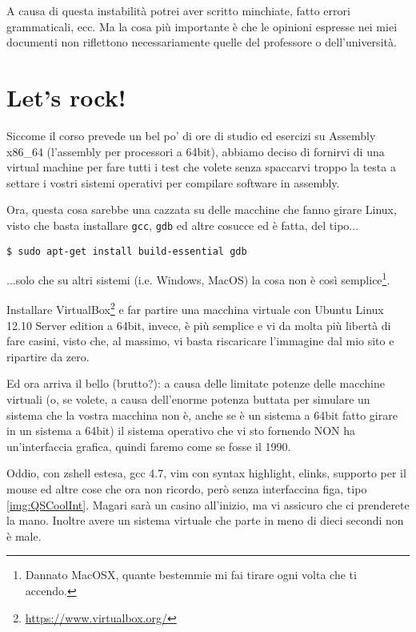 \documentclass[a4paper]{memoir}
\begin{document}
		A causa di questa instabilità potrei aver scritto minchiate, fatto errori
		grammaticali, ecc. Ma la cosa più
		importante è che le opinioni espresse nei miei documenti non riflettono
		necessariamente quelle del professore o dell'università.

\chapter{Let's rock!}

	Siccome il corso prevede un bel po' di ore di studio ed esercizi su Assembly x86\_{}64
	(l'assembly per processori a 64bit), abbiamo deciso di fornirvi di una virtual
	machine per fare tutti i test che volete senza spaccarvi troppo la testa a settare
	i vostri sistemi operativi per compilare software in assembly.
	
	Ora, questa cosa sarebbe una cazzata su delle macchine che fanno girare Linux, visto
	che basta installare \texttt{gcc}, \texttt{gdb} ed altre cosucce ed è fatta, del tipo...
	
	\begin{Verbatim}[label=È tutto più semplice con linux quando si parla di programmazione]
$ sudo apt-get install build-essential gdb
	\end{Verbatim}
	
	...solo che su altri sistemi (i.e. Windows, MacOS) la cosa non è così semplice\footnote{Dannato
	MacOSX, quante bestemmie mi fai tirare ogni volta che ti accendo.}.
	
	Installare VirtualBox\footnote{\url{https://www.virtualbox.org/}} e far partire una macchina
	virtuale con Ubuntu Linux 12.10 Server edition
	a 64bit, invece, è più semplice e vi da molta più libertà di fare casini, visto che, al massimo,
	vi basta riscaricare l'immagine dal mio sito e ripartire da zero.
	
	Ed ora arriva il bello (brutto?): a causa delle limitate potenze delle macchine virtuali
	(o, se volete, a causa dell'enorme potenza buttata per simulare un sistema che la vostra macchina
	non è, anche se è un sistema a 64bit fatto girare in un sistema a 64bit) il sistema
	operativo che vi sto fornendo NON ha un'interfaccia grafica, quindi faremo come se fosse il 1990.
	
	Oddio, con zshell estesa, gcc 4.7, vim con syntax highlight, elinks, supporto per il mouse ed altre cose
	che ora non ricordo, però senza interfaccina figa, tipo \ref{img:QSCoolInt}. Magari sarà un casino
	all'inizio, ma vi assicuro che ci prenderete la mano. Inoltre avere un sistema virtuale che parte
	in meno di dieci secondi non è male.
	
\end{document}
